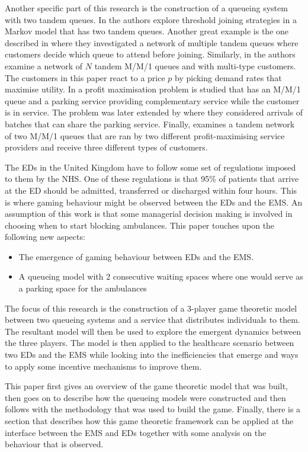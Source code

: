 Another specific part of this research is the construction of a queueing system
with two tandem queues.
In \cite{d2015pure} the authors explore threshold joining strategies in a 
Markov model that has two tandem queues.
Another great example is the one described in \cite{burnetas2013customer}
where they investigated a network of multiple tandem queues where customers 
decide which queue to attend before joining.
Similarly, in \cite{bacsar2002stackelberg} the authors examine a network of 
\(N\) tandem M/M/1 queues and with multi-type customers. 
The customers in this paper react to a price \(p\) by picking demand rates that 
maximise utility.
In \cite{veltman2005equilibrium} a profit maximisation problem is studied that
has an M/M/1 queue and a parking service providing complementary service while
the customer is in service. 
The problem was later extended by \cite{sun2009equilibrium} where they 
considered arrivals of batches that can share the parking service.
Finally, \cite{afeche2007decentralized} examines a tandem network of two M/M/1 
queues that are ran by two different profit-maximising service providers and 
receive three different types of customers.

The EDs in the United Kingdom have to follow some set of regulations imposed to 
them by the NHS.
One of these regulations is that 95\% of patients that arrive at the ED should 
be admitted, transferred or discharged within four hours.
This is where gaming behaviour might be observed between the EDs and the EMS.
An assumption of this work is that some managerial decision making is involved
in choosing when to start blocking ambulances.
This paper touches upon the following new aspects:
\begin{itemize}
    \item The emergence of gaming behaviour between EDs and the EMS.
    \item A queueing model with 2 consecutive waiting spaces where one would 
    serve as a parking space for the ambulances
\end{itemize}
The focus of this research is the construction of a 3-player game theoretic 
model between two queueing systems and a service that distributes individuals
to them. 
The resultant model will then be used to explore the emergent dynamics between 
the three players.
The model is then applied to the healthcare scenario between two EDs and the 
EMS while looking into the inefficiencies that emerge and ways to apply some 
incentive mechanisms to improve them.

This paper first gives an overview of the game theoretic model that was built, 
then goes on to describe how the queueing models were constructed and then 
follows with the methodology that was used to build the game.
Finally, there is a section that describes how this game theoretic framework
can be applied at the interface between the EMS and EDs together with some 
analysis on the behaviour that is observed.


